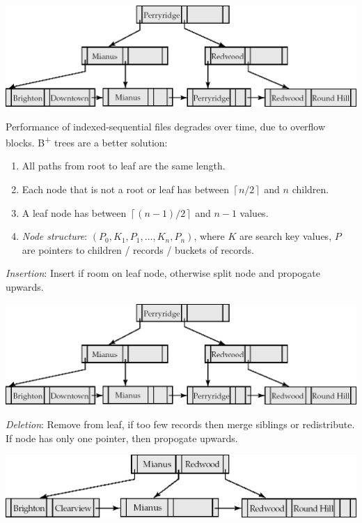 \documentclass[twocolumn,english]{article}
\begin{document}
\begin{center}
\includegraphics[scale=0.2]{img/b+tree}
\par\end{center}

\noindent Performance of indexed-sequential files degrades over time,
due to overflow blocks. B\textsuperscript{+} trees are a better solution:
\begin{enumerate}
\item All paths from root to leaf are the same length.
\item Each node that is not a root or leaf has between $\left\lceil n/2\right\rceil $
and $n$ children.
\item A leaf node has between $\left\lceil \left(n-1\right)/2\right\rceil $
and $n-1$ values.
\item \emph{Node structure}: $\left(P_{0},K_{1},P_{1},\dots,K_{n},P_{n}\right)$,
where $K$ are search key values, $P$ are pointers to children /
records / buckets of records.
\end{enumerate}
\emph{Insertion}: Insert if room on leaf node, otherwise split node
and propogate upwards.

\begin{center}
\includegraphics[scale=0.2]{img/b+tree}
\par\end{center}

\noindent \emph{Deletion}: Remove from leaf, if too few records then
merge siblings or redistribute. If node has only one pointer, then
propogate upwards.

\begin{center}
\includegraphics[scale=0.2]{img/b+delete}
\par\end{center}
\end{document}
